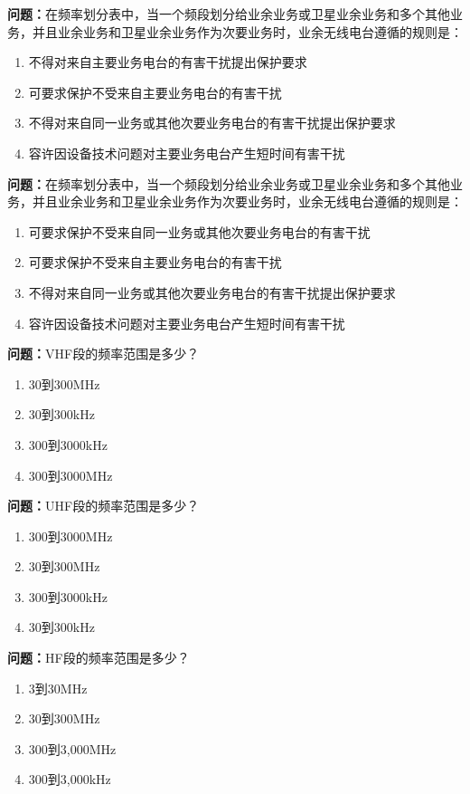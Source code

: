 \documentclass{ctexbook}
\begin{document}
\textbf{问题：}在频率划分表中，当一个频段划分给业余业务或卫星业余业务和多个其他业务，并且业余业务和卫星业余业务作为次要业务时，业余无线电台遵循的规则是：
\begin{enumerate}[label=\Alph*), leftmargin=3em]
\item 不得对来自主要业务电台的有害干扰提出保护要求
\item 可要求保护不受来自主要业务电台的有害干扰
\item 不得对来自同一业务或其他次要业务电台的有害干扰提出保护要求
\item 容许因设备技术问题对主要业务电台产生短时间有害干扰
\end{enumerate}

\textbf{问题：}在频率划分表中，当一个频段划分给业余业务或卫星业余业务和多个其他业务，并且业余业务和卫星业余业务作为次要业务时，业余无线电台遵循的规则是：
\begin{enumerate}[label=\Alph*), leftmargin=3em]
\item 可要求保护不受来自同一业务或其他次要业务电台的有害干扰
\item 可要求保护不受来自主要业务电台的有害干扰
\item 不得对来自同一业务或其他次要业务电台的有害干扰提出保护要求
\item 容许因设备技术问题对主要业务电台产生短时间有害干扰
\end{enumerate}

\textbf{问题：}VHF段的频率范围是多少？
\begin{enumerate}[label=\Alph*), leftmargin=3em]
\item 30到300MHz
\item 30到300kHz
\item 300到3000kHz
\item 300到3000MHz
\end{enumerate}

\textbf{问题：}UHF段的频率范围是多少？
\begin{enumerate}[label=\Alph*), leftmargin=3em]
\item 300到3000MHz
\item 30到300MHz
\item 300到3000kHz
\item 30到300kHz
\end{enumerate}

\textbf{问题：}HF段的频率范围是多少？
\begin{enumerate}[label=\Alph*), leftmargin=3em]
\item 3到30MHz
\item 30到300MHz
\item 300到3,000MHz
\item 300到3,000kHz
\end{enumerate}
\end{document}

